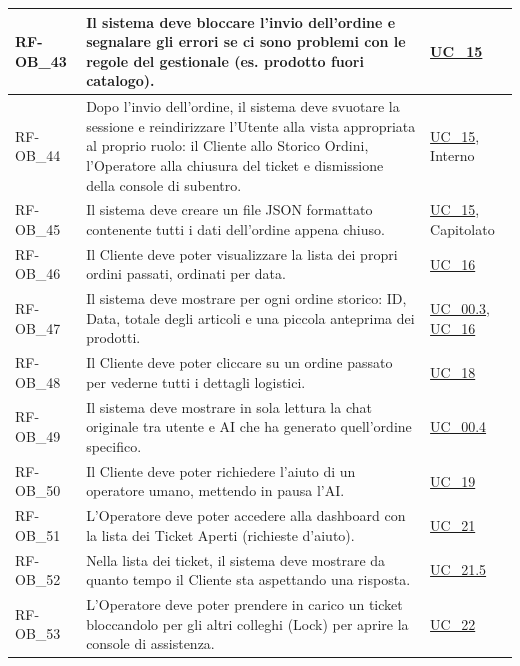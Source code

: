 \begin{longtable}{|>{\raggedright}p{}|>{\raggedright\arraybackslash}p{}|>{\raggedright\arraybackslash}p{}|}
    \hline
    RF-OB\_43 \hypertarget{rf-ob_43} & Il sistema deve bloccare l'invio dell'ordine e segnalare gli errori se ci sono problemi con le regole del gestionale (es. prodotto fuori catalogo). & \hyperref[uc_15]{UC\_15} \\
    \hline
    RF-OB\_44 \hypertarget{rf-ob_44} & Dopo l'invio dell'ordine, il sistema deve svuotare la sessione e reindirizzare l'Utente alla vista appropriata al proprio ruolo: il Cliente allo Storico Ordini, l'Operatore alla chiusura del ticket e dismissione della console di subentro. & \hyperref[uc_15]{UC\_15}, Interno \\
    \hline
    RF-OB\_45 \hypertarget{rf-ob_45} & Il sistema deve creare un file JSON formattato contenente tutti i dati dell'ordine appena chiuso. & \hyperref[uc_15]{UC\_15}, Capitolato \\
    \hline
    RF-OB\_46 \hypertarget{rf-ob_46} & Il Cliente deve poter visualizzare la lista dei propri ordini passati, ordinati per data. & \hyperref[uc_16]{UC\_16} \\
    \hline
    RF-OB\_47 \hypertarget{rf-ob_47} & Il sistema deve mostrare per ogni ordine storico: ID, Data, totale degli articoli e una piccola anteprima dei prodotti. & \hyperref[uc_00.3]{UC\_00.3}, \hyperref[uc_16]{UC\_16} \\
    \hline
    RF-OB\_48 \hypertarget{rf-ob_48} & Il Cliente deve poter cliccare su un ordine passato per vederne tutti i dettagli logistici. & \hyperref[uc_18]{UC\_18} \\
    \hline
    RF-OB\_49 \hypertarget{rf-ob_49} & Il sistema deve mostrare in sola lettura la chat originale tra utente e AI che ha generato quell'ordine specifico. & \hyperref[uc_00.4]{UC\_00.4} \\
    \hline
    RF-OB\_50 \hypertarget{rf-ob_50} & Il Cliente deve poter richiedere l'aiuto di un operatore umano, mettendo in pausa l'AI. & \hyperref[uc_19]{UC\_19} \\
    \hline
    RF-OB\_51 \hypertarget{rf-ob_51} & L'Operatore deve poter accedere alla dashboard con la lista dei Ticket Aperti (richieste d'aiuto). & \hyperref[uc_21]{UC\_21} \\
    \hline
    RF-OB\_52 \hypertarget{rf-ob_52} & Nella lista dei ticket, il sistema deve mostrare da quanto tempo il Cliente sta aspettando una risposta. & \hyperref[uc_21.5]{UC\_21.5} \\
    \hline
    RF-OB\_53 \hypertarget{rf-ob_53} & L'Operatore deve poter prendere in carico un ticket bloccandolo per gli altri colleghi (Lock) per aprire la console di assistenza. & \hyperref[uc_22]{UC\_22} \\

\end{longtable}
